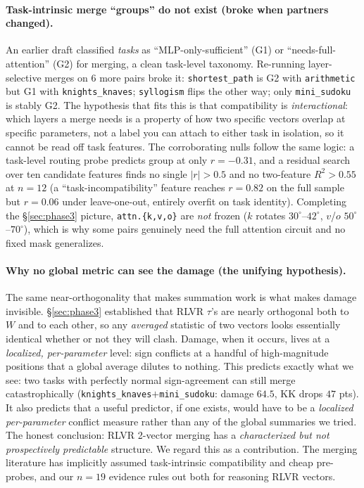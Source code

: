 \documentclass{article}
\newcommand{\tv}{\tau}
\newcommand{\dg}{^{\circ}}
\begin{document}
\paragraph{Task-intrinsic merge ``groups'' do not exist (broke when partners changed).} An earlier
draft classified \emph{tasks} as ``MLP-only-sufficient'' (G1) or ``needs-full-attention'' (G2) for
merging, a clean task-level taxonomy. Re-running layer-selective merges on 6 more pairs broke it:
\texttt{shortest\_path} is G2 with \texttt{arithmetic} but G1 with \texttt{knights\_knaves};
\texttt{syllogism} flips the other way; only \texttt{mini\_sudoku} is stably G2. The hypothesis
that fits this is that compatibility is \emph{interactional}: which layers a merge needs is a
property of how two specific vectors overlap at specific parameters, not a label you can attach to
either task in isolation, so it cannot be read off task features. The corroborating nulls follow
the same logic: a task-level routing probe predicts group at only $r{=}{-}0.31$, and a residual
search over ten candidate features finds no single $|r|>0.5$ and no two-feature $R^2>0.55$ at
$n{=}12$ (a ``task-incompatibility'' feature reaches $r{=}0.82$ on the full sample but $r{=}0.06$
under leave-one-out, entirely overfit on task identity). Completing the \S\ref{sec:phase3} picture,
\texttt{attn.\{k,v,o\}} are \emph{not} frozen ($k$ rotates $30\dg$--$42\dg$, $v$/$o$
$50\dg$--$70\dg$), which is why some pairs genuinely need the full attention circuit and no fixed
mask generalizes.

\paragraph{Why no global metric can see the damage (the unifying hypothesis).} The same
near-orthogonality that makes summation work is what makes damage invisible. \S\ref{sec:phase3}
established that RLVR $\tv$'s are nearly orthogonal both to $W$ and to each other, so any
\emph{averaged} statistic of two vectors looks essentially identical whether or not they will
clash. Damage, when it occurs, lives at a \emph{localized, per-parameter} level: sign conflicts at
a handful of high-magnitude positions that a global average dilutes to nothing. This predicts
exactly what we see: two tasks with perfectly normal sign-agreement can still merge
catastrophically (\texttt{knights\_knaves}$+$\texttt{mini\_sudoku}: damage $64.5$, KK drops
$47$ pts). It also predicts that a useful predictor, if one exists, would have to be a
\emph{localized per-parameter} conflict measure rather than any of the global summaries we tried.
The honest conclusion: RLVR 2-vector merging has a \emph{characterized but not prospectively
predictable} structure. We regard this as a contribution. The merging literature has implicitly
assumed task-intrinsic compatibility and cheap pre-probes, and our $n{=}19$ evidence rules out both
for reasoning RLVR vectors.
\end{document}
